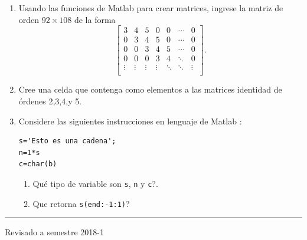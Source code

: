 \documentclass[letter,11pt]{article}
\newcommand\0{\mathbf{0}}
\newcommand{\matlab}{{\sc Matlab }}
\begin{document}
\begin{enumerate}
$$
A=\begin{bmatrix}
1 & 2 & 3\\
4 & 2 & 5\\
1 & 0 & 1
\end{bmatrix}
\quad 
B=
\frac{1}{2}
\begin{bmatrix}
-2 & 2  & -4\\
-1 & 2  & -7\\
2  & -2 & 6
\end{bmatrix}
$$
\begin{enumerate}
	\item Ingrese a \matlab las matrices \texttt{A} y \texttt{B}.
    \item Calcule en \matlab los productos matriciales $AB$ y $BA$.
    \item \textquestiondown Qu\'e observa de los resultados anteriores?
    \item Calcule las normas 1, 2 e infinito de $A$  Y $B$.
\end{enumerate}

\item Usando las funciones de \matlab para crear matrices, ingrese la matriz de orden $92\times 108$ de la forma
$$
\begin{bmatrix}
3 & 4 & 5 & 0 & 0 & \cdots & 0 \\
0 & 3 & 4 & 5 & 0 & \cdots & 0 \\
0 & 0 & 3 & 4 & 5 & \cdots & 0 \\
0 & 0 & 0 & 3 & 4 & \ddots & 0 \\
\vdots & \vdots & \vdots & \vdots & \ddots & \ddots & \vdots \\
\end{bmatrix}.
$$

\item Cree una celda que contenga como elementos a las matrices identidad de \'ordenes 2,3,4,y 5.

\item Considere las siguientes instrucciones en lenguaje de \matlab:
\begin{lstlisting}
s='Esto es una cadena';
n=1*s
c=char(b)
\end{lstlisting}
\begin{enumerate}
\item \textquestiondown Qu\'e tipo de variable son \texttt{s}, \texttt{n} y \texttt{c}?.
\item \textquestiondown Que retorna \texttt{s(end:-1:1)}?
\end{enumerate}
\end{enumerate}

\vfill
\hrule
\par
\medskip
 \hfill Revisado a semestre 2018-1
\end{document}
